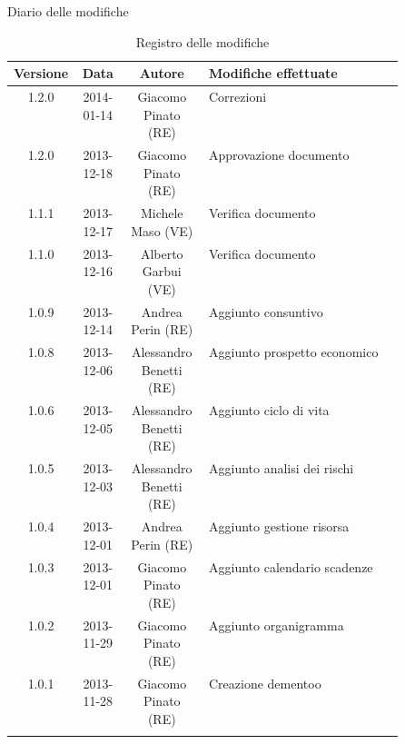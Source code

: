 
\newpage
Diario delle modifiche
\begin{center}
\begin{longtable}{|c|c|c|p{0.5\linewidth}|}
\toprule
\textbf{Versione} & \textbf{Data} & \textbf{Autore} & \textbf{Modifiche effettuate}\\


\midrule
1.2.0 & 2014-01-14 & Giacomo Pinato (RE) & Correzioni\\
\midrule
1.2.0 & 2013-12-18 & Giacomo Pinato (RE) & Approvazione documento\\
\midrule
1.1.1 & 2013-12-17 & Michele Maso (VE) & Verifica documento\\
\midrule
1.1.0 & 2013-12-16 & Alberto Garbui (VE) & Verifica documento\\
\midrule
1.0.9 & 2013-12-14 & Andrea Perin (RE) & Aggiunto consuntivo\\
\midrule
1.0.8 & 2013-12-06 & Alessandro Benetti (RE) & Aggiunto prospetto economico\\
\midrule
1.0.6 & 2013-12-05 & Alessandro Benetti (RE) & Aggiunto ciclo di vita\\
\midrule
1.0.5 & 2013-12-03 & Alessandro Benetti (RE) & Aggiunto analisi dei rischi\\
\midrule
1.0.4 & 2013-12-01 & Andrea Perin (RE) & Aggiunto gestione risorsa\\
\midrule
1.0.3 & 2013-12-01 & Giacomo Pinato (RE) & Aggiunto calendario scadenze\\
\midrule
1.0.2 & 2013-11-29 & Giacomo Pinato (RE) & Aggiunto organigramma\\
\midrule
1.0.1 & 2013-11-28 & Giacomo Pinato (RE) & Creazione dementoo\\

\bottomrule
\caption{Registro delle modifiche}
\label{tab:changelog}
\end{longtable}
\end{center}

\newpage
\tableofcontents

\newpage
\listoftables
\listoffigures


